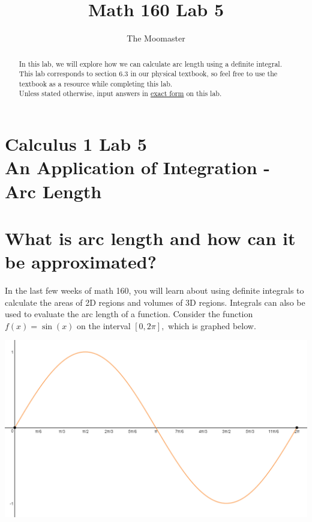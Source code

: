 \documentclass[handout,nooutcomes]{ximera}
\title{Math 160 Lab 5}
\author{The Moomaster}
\begin{document}
\section{Calculus 1 Lab 5 \\ An Application of Integration - Arc Length}

\begin{abstract}
In this lab, we will explore how we can calculate arc length using a definite integral.  This lab corresponds to section 6.3 in our physical textbook, so feel free to use the textbook as a resource while completing this lab.\\

Unless stated otherwise, input answers in \underline{exact form} on this lab.
\end{abstract}

\maketitle


\section {What is arc length and how can it be approximated?}

In the last few weeks of math 160, you will learn about using definite integrals to calculate the areas of 2D regions and volumes of 3D regions.  Integrals can also be used to evaluate the arc length of a function.  Consider the function $f(x) = \sin(x)$ on the interval $[0,2\pi],$ which is graphed below.  \\

\begin{center} \includegraphics{sinx.png} \end{center}
\end{document}
